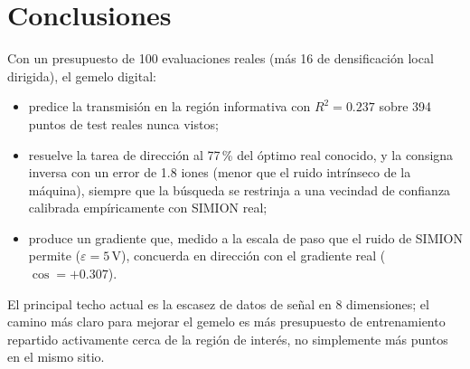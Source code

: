 \documentclass[11pt]{article}
\begin{document}
\section{Conclusiones}

Con un presupuesto de 100 evaluaciones reales (más 16 de densificación local
dirigida), el gemelo digital:
\begin{itemize}
  \item predice la transmisión en la región informativa con $R^2=0.237$
  sobre 394 puntos de test reales nunca vistos;
  \item resuelve la tarea de dirección al 77\,\% del óptimo real conocido, y
  la consigna inversa con un error de 1.8 iones (menor que el ruido intrínseco
  de la máquina), siempre que la búsqueda se restrinja a una vecindad de
  confianza calibrada empíricamente con SIMION real;
  \item produce un gradiente que, medido a la escala de paso que el ruido de
  SIMION permite ($\varepsilon=5\,$V), concuerda en dirección con el
  gradiente real ($\cos=+0.307$).
\end{itemize}
El principal techo actual es la escasez de datos de señal en 8 dimensiones;
el camino más claro para mejorar el gemelo es más presupuesto de
entrenamiento repartido activamente cerca de la región de interés, no
simplemente más puntos en el mismo sitio.
\end{document}
